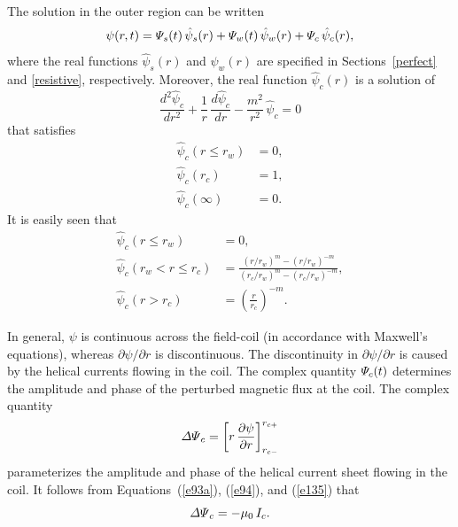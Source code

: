 \documentclass[notitlepage,12pt]{article}
\begin{document}
The solution in the outer region can be written
\begin{equation}
\psi(r,t) = {\mit\Psi}_s(t)\,\hat{\psi}_s(r) + {\mit\Psi}_w(t)\,\hat{\psi}_w(r) + {\mit\Psi}_c\,\hat{\psi}_c(r),
\end{equation}
where the real functions $\hat{\psi}_s(r)$ and $\hat{\psi}_w(r)$ are specified in Sections~\ref{perfect} and \ref{resistive}, respectively. 
Moreover, 
the real function  $\hat{\psi}_c(r)$ is a solution of 
\begin{equation}\label{e100b}
\frac{d^2\hat{\psi}_c}{dr^2} + \frac{1}{r}\,\frac{d\hat{\psi}_c}{dr}-\frac{m^2}{r^2}\,\hat{\psi}_c=  0
\end{equation}
that satisfies
\begin{align}
\hat{\psi}_c(r\leq r_w) &= 0,\\[0.5ex]
\hat{\psi}_c(r_c) &= 1,\\[0.5ex]
\hat{\psi}_c(\infty) &= 0.
\end{align}
It is easily seen that
\begin{align}
\hat{\psi}_c(r\leq r_w) &= 0,\\[0.5ex]
\hat{\psi}_c(r_w<r \leq r_c) &= \frac{(r/r_w)^m-(r/r_w)^{-m}}{(r_c/r_w)^m - (r_c/r_w)^{-m}},\label{e142}\\[0.5ex]
\hat{\psi}_c(r> r_c) &=\left(\frac{r}{r_c}\right)^{-m}.\label{e143}
\end{align}

In general, $\psi$ is continuous across the field-coil (in accordance with Maxwell's equations), whereas $\partial\psi/\partial r$ is discontinuous. The discontinuity in $\partial\psi/\partial r$ is caused by the helical currents flowing in the coil. The complex quantity ${\mit\Psi}_c(t)$ determines the amplitude and
phase of the perturbed magnetic flux at the coil. The complex quantity
\begin{equation}\label{e118a}
{\mit\Delta\Psi}_c = \left[r\,\frac{\partial\psi}{\partial r}\right]_{r_{c-}}^{r_{c+}}
\end{equation}
parameterizes the amplitude and phase of the helical  current sheet flowing in the coil.
It follows from Equations~(\ref{e93a}), (\ref{e94}), and (\ref{e135})  that
\begin{equation}\label{e145}
{\mit\Delta\Psi}_c = -\mu_0\,I_c.
\end{equation}
\end{document}
